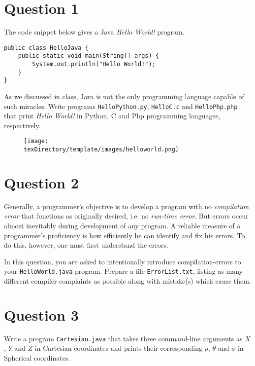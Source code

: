 \documentclass[12pt,letterpaper,twoside]{article}
\begin{document}


\section*{Question 1}

The code snippet below gives a Java \textit{Hello World!} program.
\lstset{language=Java}
\begin{lstlisting}
public class HelloJava {
	public static void main(String[] args) {
		System.out.println("Hello World!");
	}
}
\end{lstlisting}
As we discussed in class, Java is not the only programming language capable of such miracles. Write programs \texttt{HelloPython.py}, \texttt{HelloC.c} and \texttt{HelloPhp.php} that print \textit{Hello World!} in Python, C and Php programming languages, respectively.
\begin{figure}[H]\centering
\texttt{[image: \\texDirectory/template/images/helloworld.png]}
\end{figure}

\section*{Question 2}

Generally, a programmer's objective is to develop a program with no \textit{compilation error} that functions as originally desired, i.e. no \textit{run-time error}.
But errors occur almost inevitably during development of any program.
A reliable measure of a programmer's proficiency is how efficiently he can identify and fix his errors.
To do this, however, one must first understand the errors.

In this question, you are asked to intentionally introduce compilation-errors to your \texttt{HelloWorld.java} program. Prepare a file \texttt{ErrorList.txt}, listing as many different compiler complaints as possible along with mistake(s) which cause them.

\section*{Question 3}

Write a program \texttt{Cartesian.java} that takes three command-line arguments as $X$, $Y$ and $Z$ in Cartesian coordinates and prints their corresponding $\rho$, $\theta$ and $\phi$ in Spherical coordinates.
\end{document}

